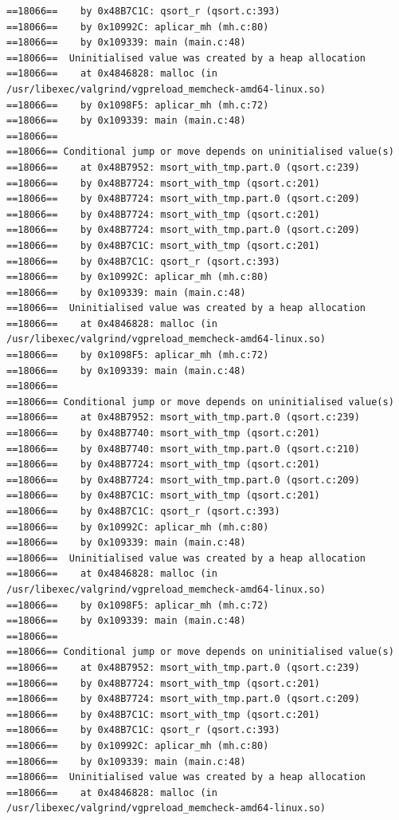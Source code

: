\documentclass[12pt]{article}
\begin{document}
\begin{lstlisting}[style=EstiloValgrind]
==18066==    by 0x48B7C1C: qsort_r (qsort.c:393)
==18066==    by 0x10992C: aplicar_mh (mh.c:80)
==18066==    by 0x109339: main (main.c:48)
==18066==  Uninitialised value was created by a heap allocation
==18066==    at 0x4846828: malloc (in /usr/libexec/valgrind/vgpreload_memcheck-amd64-linux.so)
==18066==    by 0x1098F5: aplicar_mh (mh.c:72)
==18066==    by 0x109339: main (main.c:48)
==18066== 
==18066== Conditional jump or move depends on uninitialised value(s)
==18066==    at 0x48B7952: msort_with_tmp.part.0 (qsort.c:239)
==18066==    by 0x48B7724: msort_with_tmp (qsort.c:201)
==18066==    by 0x48B7724: msort_with_tmp.part.0 (qsort.c:209)
==18066==    by 0x48B7724: msort_with_tmp (qsort.c:201)
==18066==    by 0x48B7724: msort_with_tmp.part.0 (qsort.c:209)
==18066==    by 0x48B7C1C: msort_with_tmp (qsort.c:201)
==18066==    by 0x48B7C1C: qsort_r (qsort.c:393)
==18066==    by 0x10992C: aplicar_mh (mh.c:80)
==18066==    by 0x109339: main (main.c:48)
==18066==  Uninitialised value was created by a heap allocation
==18066==    at 0x4846828: malloc (in /usr/libexec/valgrind/vgpreload_memcheck-amd64-linux.so)
==18066==    by 0x1098F5: aplicar_mh (mh.c:72)
==18066==    by 0x109339: main (main.c:48)
==18066== 
==18066== Conditional jump or move depends on uninitialised value(s)
==18066==    at 0x48B7952: msort_with_tmp.part.0 (qsort.c:239)
==18066==    by 0x48B7740: msort_with_tmp (qsort.c:201)
==18066==    by 0x48B7740: msort_with_tmp.part.0 (qsort.c:210)
==18066==    by 0x48B7724: msort_with_tmp (qsort.c:201)
==18066==    by 0x48B7724: msort_with_tmp.part.0 (qsort.c:209)
==18066==    by 0x48B7C1C: msort_with_tmp (qsort.c:201)
==18066==    by 0x48B7C1C: qsort_r (qsort.c:393)
==18066==    by 0x10992C: aplicar_mh (mh.c:80)
==18066==    by 0x109339: main (main.c:48)
==18066==  Uninitialised value was created by a heap allocation
==18066==    at 0x4846828: malloc (in /usr/libexec/valgrind/vgpreload_memcheck-amd64-linux.so)
==18066==    by 0x1098F5: aplicar_mh (mh.c:72)
==18066==    by 0x109339: main (main.c:48)
==18066== 
==18066== Conditional jump or move depends on uninitialised value(s)
==18066==    at 0x48B7952: msort_with_tmp.part.0 (qsort.c:239)
==18066==    by 0x48B7724: msort_with_tmp (qsort.c:201)
==18066==    by 0x48B7724: msort_with_tmp.part.0 (qsort.c:209)
==18066==    by 0x48B7C1C: msort_with_tmp (qsort.c:201)
==18066==    by 0x48B7C1C: qsort_r (qsort.c:393)
==18066==    by 0x10992C: aplicar_mh (mh.c:80)
==18066==    by 0x109339: main (main.c:48)
==18066==  Uninitialised value was created by a heap allocation
==18066==    at 0x4846828: malloc (in /usr/libexec/valgrind/vgpreload_memcheck-amd64-linux.so)

\end{lstlisting}
\end{document}
